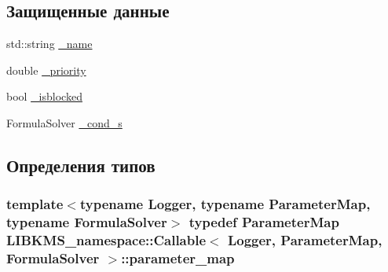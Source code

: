 \subsection*{Защищенные данные}
\begin{DoxyCompactItemize}
\item 
std\-::string \hyperlink{classLIBKMS__namespace_1_1Callable_a86675c2e858a76fff1431b34d913d6a5}{\-\_\-name}
\item 
double \hyperlink{classLIBKMS__namespace_1_1Callable_a828e2be381cf907c88054e604a17f5a4}{\-\_\-priority}
\item 
bool \hyperlink{classLIBKMS__namespace_1_1Callable_a32c7bfc356667f15d5b40fc2ce41e2f7}{\-\_\-isblocked}
\item 
Formula\-Solver \hyperlink{classLIBKMS__namespace_1_1Callable_a0a2d1ea087e901a7cce848ff0efba7ca}{\-\_\-cond\-\_\-s}
\end{DoxyCompactItemize}


\subsection{Определения типов}
\hypertarget{classLIBKMS__namespace_1_1Callable_ad58caabaa5ac247c9d385e6d5451916a}{
\subsubsection[{parameter\-\_\-map}]{\setlength{\rightskip}{0pt plus 5cm}template$<$typename Logger, typename Parameter\-Map, typename Formula\-Solver$>$ typedef Parameter\-Map {\bf L\-I\-B\-K\-M\-S\-\_\-namespace\-::\-Callable}$<$ Logger, Parameter\-Map, Formula\-Solver $>$\-::{\bf parameter\-\_\-map}}}\label{classLIBKMS__namespace_1_1Callable_ad58caabaa5ac247c9d385e6d5451916a}



